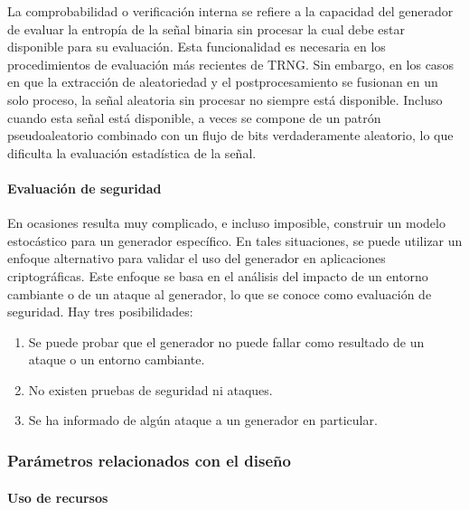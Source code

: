                 La comprobabilidad o verificación interna se refiere a la capacidad del generador de evaluar la entropía de la señal binaria sin procesar la cual debe estar disponible para su evaluación. Esta funcionalidad es necesaria en los procedimientos de evaluación más recientes de TRNG. Sin embargo, en los casos en que la extracción de aleatoriedad y el postprocesamiento se fusionan en un solo proceso, la señal aleatoria sin procesar no siempre está disponible. Incluso cuando esta señal está disponible, a veces se compone de un patrón pseudoaleatorio combinado con un flujo de bits verdaderamente aleatorio, lo que dificulta la evaluación estadística de la señal. 

	            \paragraph{Evaluación de seguridad\\}

                En ocasiones resulta muy complicado, e incluso imposible, construir un modelo estocástico para un generador específico. En tales situaciones, se puede utilizar un enfoque alternativo para validar el uso del generador en aplicaciones criptográficas. Este enfoque se basa en el análisis del impacto de un entorno cambiante o de un ataque al generador, lo que se conoce como evaluación de seguridad. Hay tres posibilidades: 
				
                \begin{enumerate}[noitemsep, label=(\roman*)]
                    \item Se puede probar que el generador no puede fallar como resultado de un ataque o un entorno cambiante.
                    \item No existen pruebas de seguridad ni ataques.
                    \item Se ha informado de algún ataque a un generador en particular.
                \end{enumerate}		

	        \subsubsection{Parámetros relacionados con el diseño}	
		
	            \paragraph{Uso de recursos\\}
				
